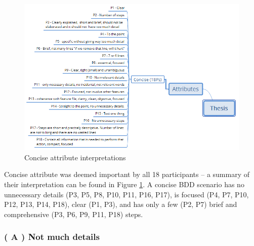 \begin{figure}[t]
	\centering
	\includegraphics[scale=0.8]{images/concise_attribute}
	\caption{Concise attribute interpretations}
	\label{fig:concise_attribute}
\end{figure}

Concise attribute was deemed important by all 18 participants -- a summary of their interpretation can be found in Figure \ref{fig:concise_attribute}. A concise BDD scenario has no unnecessary details (P3, P5, P8, P10, P11, P16, P17), is focused (P4, P7, P10, P12, P13, P14, P18), clear (P1, P3), and has only a few (P2, P7) brief and comprehensive (P3, P6, P9, P11, P18) steps.

\subsubsection{\textbf{( A ) Not much details}}

